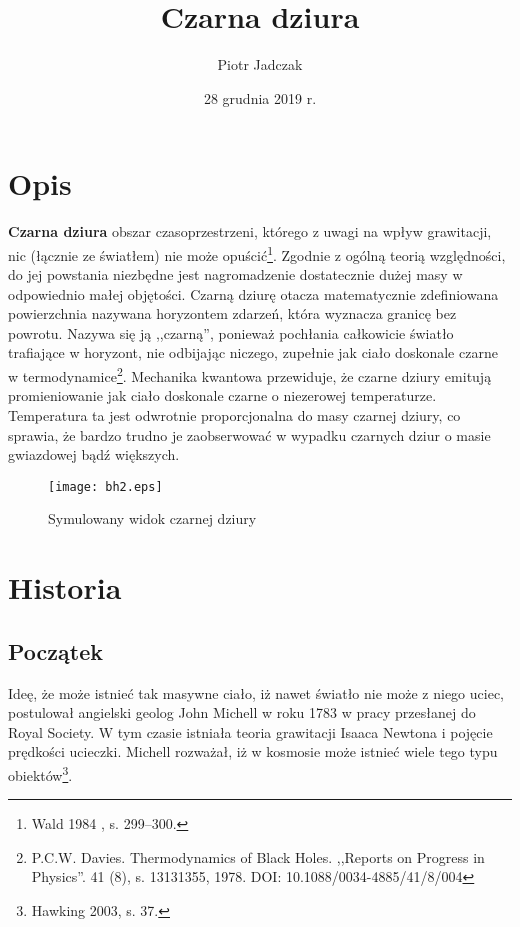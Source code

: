 \documentclass[12pt]{article}
\title{Czarna dziura}
\author{Piotr Jadczak}
\date{28 grudnia 2019 r.}
\begin{document}
\maketitle
\newpage
\section{Opis}

\textbf{Czarna dziura} \textendash{} obszar czasoprzestrzeni, kt\'{o}rego z uwagi na wp\l{}yw grawitacji, nic (\l{}\k{a}cznie ze \'{s}wiat\l{}em) nie mo\.{z}e opu\'{s}ci\'{c}\footnote[1]{Wald 1984 , s. 299–300.}. Zgodnie z og\'{o}ln\k{a} teori\k{a} wzgl\k{e}dno\'{s}ci, do jej powstania niezb\k{e}dne jest nagromadzenie dostatecznie du\.{z}ej masy w odpowiednio ma\l{}ej obj\k{e}to\'{s}ci. Czarn\k{a} dziur\k{e} otacza matematycznie zdefiniowana powierzchnia nazywana horyzontem zdarze\'{n}, kt\'{o}ra wyznacza granic\k{e} bez powrotu. Nazywa si\k{e} j\k{a} ,,czarn\k{a}\textquotedblright{}, poniewa\.{z} poch\l{}ania ca\l{}kowicie \'{s}wiat\l{}o trafiaj\k{a}ce w horyzont, nie odbijaj\k{a}c niczego, zupe\l{}nie jak cia\l{}o doskonale czarne w termodynamice\footnote[2]{P.C.W. Davies. Thermodynamics of Black Holes. ,,Reports on Progress in Physics\textquotedblright{}. 41 (8), s. 1313\textendash{}1355, 1978. DOI: 10.1088/0034-4885/41/8/004}. Mechanika kwantowa przewiduje, \.{z}e czarne dziury emituj\k{a} promieniowanie jak cia\l{}o doskonale czarne o niezerowej temperaturze. Temperatura ta jest odwrotnie proporcjonalna do masy czarnej dziury, co sprawia, \.{z}e bardzo trudno je zaobserwowa\'{c} w wypadku czarnych dziur o masie gwiazdowej b\k{a}d\'{z} wi\k{e}kszych\cite{theory}.

\begin{figure}[ht]
\begin{center}
\texttt{[image: bh2.eps]}
\caption{Symulowany widok czarnej dziury}
\label{rys_model_bh}
\end{center}
\end{figure}


\newpage
\section{Historia}
\subsection{Pocz\k{a}tek}
Ide\k{e}, \.{z}e mo\.{z}e istnie\'{c} tak masywne cia\l{}o, i\.{z} nawet \'{s}wiat\l{}o nie mo\.{z}e z niego uciec, postulowa\l{} angielski geolog John Michell w roku 1783 w pracy przes\l{}anej do Royal Society. W tym czasie istnia\l{}a teoria grawitacji Isaaca Newtona i poj\k{e}cie pr\k{e}dko\'{s}ci ucieczki. Michell rozwa\.{z}a\l{}, i\.{z} w kosmosie mo\.{z}e istnie\'{c} wiele tego typu obiekt\'{o}w\footnote[3]{Hawking 2003, s. 37.}.
\end{document}
